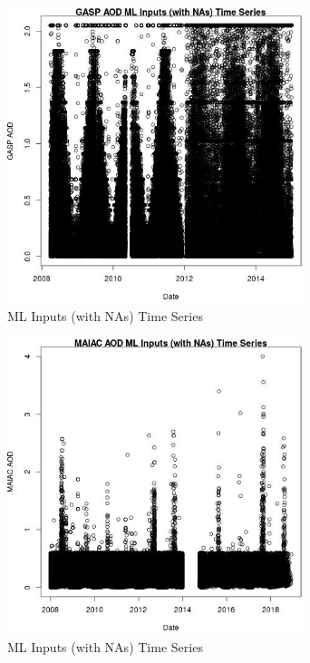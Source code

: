 \begin{figure} 
\centering  
\includegraphics[width=0.77\textwidth]{Code_Outputs/Report_ML_input_PM25_Step4_part_e_de_duplicated_aveswNAs_GASP_AODvDate.jpg} 
\caption{\label{fig:Report_ML_input_PM25_Step4_part_e_de_duplicated_aveswNAsGASP_AODvDate}ML Inputs (with NAs) Time Series} 
\end{figure} 
 

\begin{figure} 
\centering  
\includegraphics[width=0.77\textwidth]{Code_Outputs/Report_ML_input_PM25_Step4_part_e_de_duplicated_aveswNAs_MAIAC_AODvDate.jpg} 
\caption{\label{fig:Report_ML_input_PM25_Step4_part_e_de_duplicated_aveswNAsMAIAC_AODvDate}ML Inputs (with NAs) Time Series} 
\end{figure} 
 

